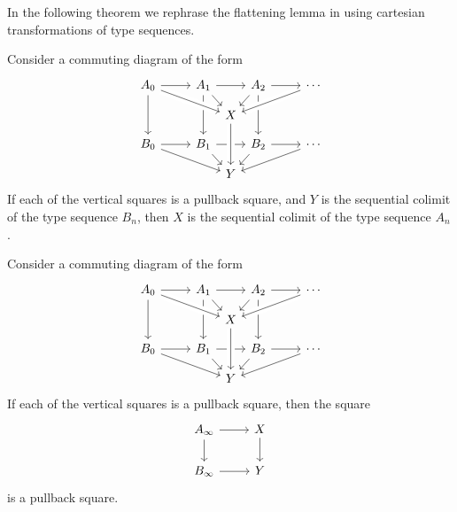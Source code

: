 In the following theorem we rephrase the flattening lemma in using cartesian transformations of type sequences.

\begin{thm}
Consider a commuting diagram of the form
\begin{equation*}
\begin{tikzcd}[column sep=small,row sep=small]
A_0 \arrow[rr] \arrow[dd] & & A_1 \arrow[rr] \arrow[dr] \arrow[dd] &[-.9em] &[-.9em] A_2 \arrow[dl] \arrow[dd] & & \cdots \\
& & & X \arrow[from=ulll,crossing over] \arrow[from=urrr,crossing over] \arrow[from=ur,to=urrr] \\
B_0 \arrow[rr] \arrow[drrr] & & B_1 \arrow[rr] \arrow[dr] & & B_2 \arrow[rr] \arrow[dl] & & \cdots \arrow[dlll] \\
& & & Y \arrow[from=uu,crossing over] 
\end{tikzcd}
\end{equation*}
If each of the vertical squares is a pullback square, and $Y$ is the sequential colimit of the type sequence $B_n$, then $X$ is the sequential colimit of the type sequence $A_n$. 
\end{thm}

\begin{cor}
Consider a commuting diagram of the form
\begin{equation*}
\begin{tikzcd}[column sep=small,row sep=small]
A_0 \arrow[rr] \arrow[dd] & & A_1 \arrow[rr] \arrow[dr] \arrow[dd] &[-.9em] &[-.9em] A_2 \arrow[dl] \arrow[dd] & & \cdots \\
& & & X \arrow[from=ulll,crossing over] \arrow[from=urrr,crossing over] \arrow[from=ur,to=urrr] \\
B_0 \arrow[rr] \arrow[drrr] & & B_1 \arrow[rr] \arrow[dr] & & B_2 \arrow[rr] \arrow[dl] & & \cdots \arrow[dlll] \\
& & & Y \arrow[from=uu,crossing over] 
\end{tikzcd}
\end{equation*}
If each of the vertical squares is a pullback square, then the square
\begin{equation*}
\begin{tikzcd}
A_\infty \arrow[r] \arrow[d] & X \arrow[d] \\
B_\infty \arrow[r] & Y
\end{tikzcd}
\end{equation*} 
is a pullback square.
\end{cor}
